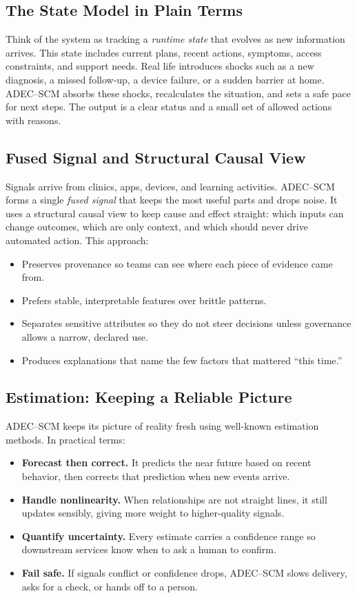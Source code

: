 \documentclass[12pt]{article}
\begin{document}
\subsection*{The State Model in Plain Terms}
Think of the system as tracking a \emph{runtime state} that evolves as new information arrives. This state includes current plans, recent actions, symptoms, access constraints, and support needs. Real life introduces shocks such as a new diagnosis, a missed follow-up, a device failure, or a sudden barrier at home. ADEC–SCM absorbs these shocks, recalculates the situation, and sets a safe pace for next steps. The output is a clear status and a small set of allowed actions with reasons.

\subsection*{Fused Signal and Structural Causal View}
Signals arrive from clinics, apps, devices, and learning activities. ADEC–SCM forms a single \emph{fused signal} that keeps the most useful parts and drops noise. It uses a structural causal view to keep cause and effect straight: which inputs can change outcomes, which are only context, and which should never drive automated action. This approach:
\begin{itemize}[leftmargin=*]
  \item Preserves provenance so teams can see where each piece of evidence came from.
  \item Prefers stable, interpretable features over brittle patterns.
  \item Separates sensitive attributes so they do not steer decisions unless governance allows a narrow, declared use.
  \item Produces explanations that name the few factors that mattered “this time.”
\end{itemize}

\subsection*{Estimation: Keeping a Reliable Picture}
ADEC–SCM keeps its picture of reality fresh using well-known estimation methods. In practical terms:
\begin{itemize}[leftmargin=*]
  \item \textbf{Forecast then correct.} It predicts the near future based on recent behavior, then corrects that prediction when new events arrive.
  \item \textbf{Handle nonlinearity.} When relationships are not straight lines, it still updates sensibly, giving more weight to higher-quality signals.
  \item \textbf{Quantify uncertainty.} Every estimate carries a confidence range so downstream services know when to ask a human to confirm.
  \item \textbf{Fail safe.} If signals conflict or confidence drops, ADEC–SCM slows delivery, asks for a check, or hands off to a person.
\end{itemize}
\end{document}
